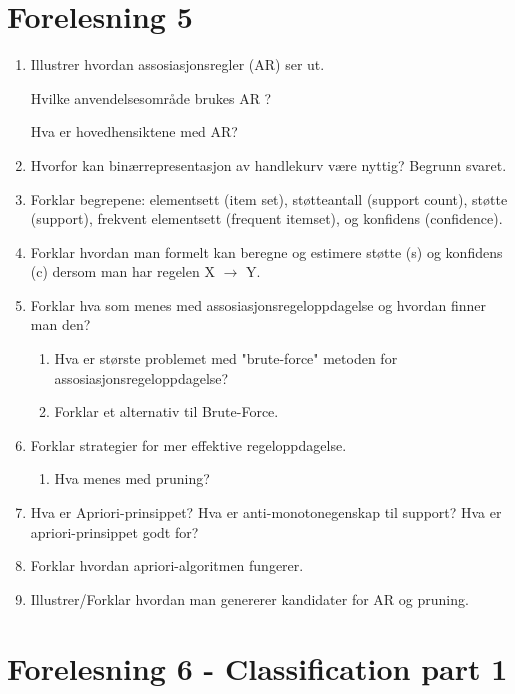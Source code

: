 	\section{Forelesning 5}
		\begin{enumerate}
			\item Illustrer hvordan assosiasjonsregler (AR) ser ut.

			Hvilke anvendelsesområde brukes AR ?

			Hva er hovedhensiktene med AR?

			\item Hvorfor kan binærrepresentasjon av handlekurv være nyttig? Begrunn svaret.
			\item Forklar begrepene: elementsett (item set), støtteantall (support count),
			støtte (support), frekvent elementsett (frequent itemset), og konfidens (confidence).
			\item Forklar hvordan man formelt kan beregne og estimere støtte (s) og konfidens (c)
			dersom man har regelen X $\rightarrow$ Y.
			\item Forklar hva som menes med assosiasjonsregeloppdagelse og hvordan finner man den?

				\begin{enumerate}
					\item Hva er største problemet med "brute-force" metoden for
					assosiasjonsregeloppdagelse?
					\item Forklar et alternativ til Brute-Force.
				\end{enumerate}

			\item Forklar strategier for mer effektive regeloppdagelse.
				\begin{enumerate}
					\item Hva menes med pruning?
				\end{enumerate}
			\item Hva er Apriori-prinsippet? Hva er anti-monotonegenskap til support? 
			Hva er apriori-prinsippet godt for?
			\item Forklar hvordan apriori-algoritmen fungerer.
			\item Illustrer/Forklar hvordan man genererer kandidater for AR og pruning. 
		\end{enumerate}

	\section{Forelesning 6 - Classification part 1}

